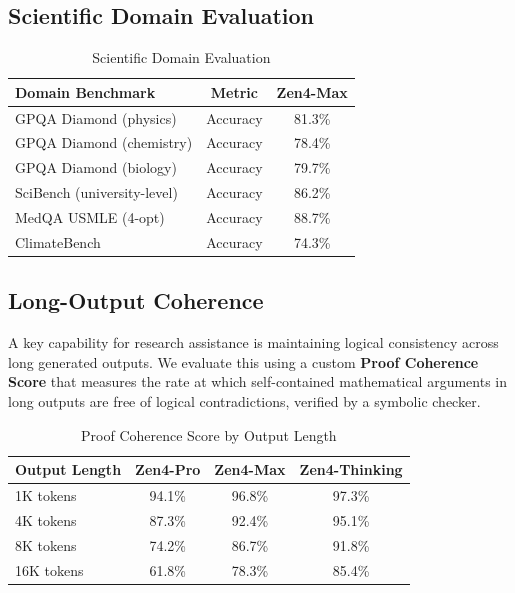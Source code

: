 \documentclass[11pt,a4paper]{article}
\begin{document}
\subsection{Scientific Domain Evaluation}

\begin{table}[H]
\centering
\begin{tabular}{lcc}
\toprule
\textbf{Domain Benchmark} & \textbf{Metric} & \textbf{Zen4-Max} \\
\midrule
GPQA Diamond (physics)     & Accuracy & 81.3\% \\
GPQA Diamond (chemistry)   & Accuracy & 78.4\% \\
GPQA Diamond (biology)     & Accuracy & 79.7\% \\
SciBench (university-level)& Accuracy & 86.2\% \\
MedQA USMLE (4-opt)        & Accuracy & 88.7\% \\
ClimateBench               & Accuracy & 74.3\% \\
\bottomrule
\end{tabular}
\caption{Scientific Domain Evaluation}
\end{table}

\subsection{Long-Output Coherence}

A key capability for research assistance is maintaining logical consistency across
long generated outputs. We evaluate this using a custom \textbf{Proof Coherence Score}
that measures the rate at which self-contained mathematical arguments in long outputs
are free of logical contradictions, verified by a symbolic checker.

\begin{table}[H]
\centering
\begin{tabular}{lccc}
\toprule
\textbf{Output Length} & \textbf{Zen4-Pro} & \textbf{Zen4-Max} & \textbf{Zen4-Thinking} \\
\midrule
1K tokens              & 94.1\% & 96.8\% & 97.3\% \\
4K tokens              & 87.3\% & 92.4\% & 95.1\% \\
8K tokens              & 74.2\% & 86.7\% & 91.8\% \\
16K tokens             & 61.8\% & 78.3\% & 85.4\% \\
\bottomrule
\end{tabular}
\caption{Proof Coherence Score by Output Length}
\end{table}
\end{document}
